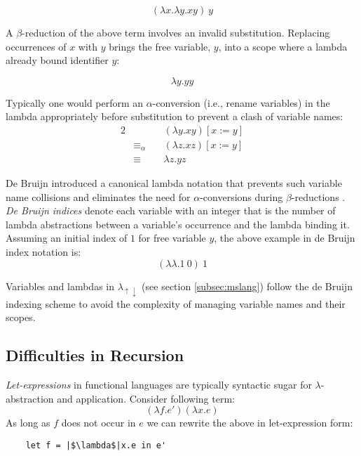\documentclass[a4paper,12pt,twoside,openright]{report}
\theoremstyle{definition}
\newcommand{\mslang}{$\lambda_{\uparrow\downarrow}$}
\begin{document}
\begin{equation*}
    (\lambda x.\lambda y.xy)\:y
\end{equation*}

A $\beta$-reduction of the above term involves an invalid substitution. Replacing occurrences of $x$ with $y$ brings the free variable, $y$, into a scope where a lambda already bound identifier $y$:

\begin{equation*}
    \lambda y.yy
\end{equation*}

Typically one would perform an $\alpha$-conversion (i.e., rename variables) in the lambda appropriately before substitution to prevent a clash of variable names:
\begin{alignat*}{2}
                  & && \: (\lambda y.xy)[x:=y]    \\
    & \equiv_\alpha && \: (\lambda z.xz)[x:=y]    \\
    & \equiv        && \: \lambda z.yz
\end{alignat*}

De Bruijn introduced a canonical lambda notation that prevents such variable name collisions and eliminates the need for $\alpha$-conversions during $\beta$-reductions \cite{de1972lambda}. \textit{De Bruijn indices} denote each variable with an integer that is the number of lambda abstractions between a variable's occurrence and the lambda binding it. Assuming an initial index of $1$ for free variable $y$, the above example in de Bruijn index notation is:
\begin{equation*}
    (\lambda \lambda. 1 \: 0) \: 1
\end{equation*}

Variables and lambdas in \mslang{} (see section \ref{subsec:mslang}) follow the de Bruijn indexing scheme to avoid the complexity of managing variable names and their scopes.

\subsection{Difficulties in Recursion}\label{subsec:recursion}
\textit{Let-expressions} in functional languages are typically syntactic sugar for $\lambda$-abstraction and application. Consider following term:
\begin{equation*}
    (\lambda f.e')(\lambda x.e)
\end{equation*}
As long as $f$ does not occur in $e$ we can rewrite the above in let-expression form:
\begin{verbatim}
    let f = |$\lambda$|x.e in e'
\end{verbatim}
\end{document}
